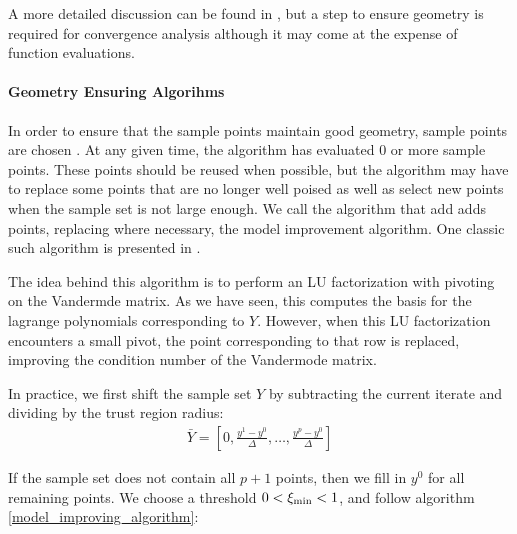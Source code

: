 \begin{center}

\end{center}

A more detailed discussion can be found in \cite{doi:10.1080/10556780802409296}, but a step to ensure geometry is required for convergence analysis although it may come at the expense of function evaluations.

\paragraph{Geometry Ensuring Algorihms}

In order to ensure that the sample points maintain good geometry, sample points are chosen .
At any given time, the algorithm has evaluated 0 or more sample points.
These points should be reused when possible, but the algorithm may have to replace some points that are no longer well poised as well as select new points when the sample set is not large enough.
We call the algorithm that add adds points, replacing where necessary, the model improvement algorithm.
One classic such algorithm is presented in \cite{DUMMY:intro_book}.

The idea behind this algorithm is to perform an LU factorization with pivoting on the Vandermde matrix.
As we have seen, this computes the basis for the lagrange polynomials corresponding to $Y$.
However, when this LU factorization encounters a small pivot, the point corresponding to that row is replaced, improving the condition number of the Vandermode matrix.

In practice, we first shift the sample set $Y$ by subtracting the current iterate and dividing by the trust region radius:
\begin{align}
\bar{Y} = [0, \frac{y^1 - y^0}{\Delta}, \ldots, \frac{y^p - y^0}{\Delta}]
\end{align}

If the sample set does not contain all $p+1$ points, then we fill in $y^0$ for all remaining points.
We choose a threshold $0 < \xi_{\text{min}} < 1$, and follow algorithm \ref{model_improving_algorithm}:

